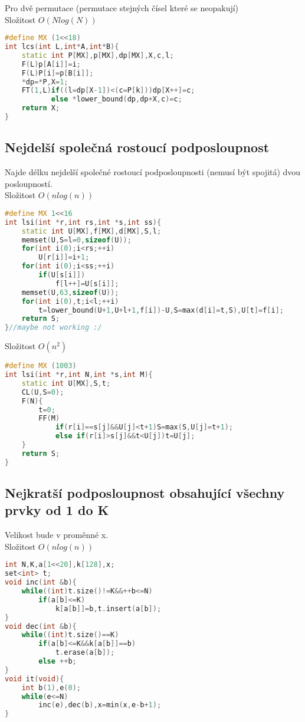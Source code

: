 \documentclass[11pt]{article}
\begin{document}
Pro dvě permutace (permutace stejných čísel které se neopakují)
\\Složitost $O(Nlog(N))$
\begin{lstlisting}[language=C++]
#define MX (1<<18)
int lcs(int L,int*A,int*B){
    static int P[MX],p[MX],dp[MX],X,c,l;
    F(L)p[A[i]]=i;
    F(L)P[i]=p[B[i]];
    *dp=*P,X=1;
    FT(1,L)if((l=dp[X-1])<(c=P[k]))dp[X++]=c;
           else *lower_bound(dp,dp+X,c)=c;
    return X;
}
\end{lstlisting}
\subsection{Nejdelší společná rostoucí podposloupnost}
Najde délku nejdelší společné rostoucí podposloupnosti (nemusí být spojitá) dvou posloupností.
\\Složitost $O(nlog(n))$
\begin{lstlisting}[language=C++]
#define MX 1<<16
int lsi(int *r,int rs,int *s,int ss){
    static int U[MX],f[MX],d[MX],S,l;
    memset(U,S=l=0,sizeof(U));
    for(int i(0);i<rs;++i)
        U[r[i]]=i+1;
    for(int i(0);i<ss;++i)
        if(U[s[i]])
            f[l++]=U[s[i]];
    memset(U,63,sizeof(U));
    for(int i(0),t;i<l;++i)
        t=lower_bound(U+1,U+l+1,f[i])-U,S=max(d[i]=t,S),U[t]=f[i];
    return S;
}//maybe not working :/
\end{lstlisting}
Složitost $O(n^2)$
\begin{lstlisting}[language=C++]
#define MX (1003)
int lsi(int *r,int N,int *s,int M){
    static int U[MX],S,t;
    CL(U,S=0);
    F(N){
        t=0;
        FF(M)
            if(r[i]==s[j]&&U[j]<t+1)S=max(S,U[j]=t+1);
            else if(r[i]>s[j]&&t<U[j])t=U[j];
    }
    return S;
}
\end{lstlisting}
\subsection{Nejkratší podposloupnost obsahující všechny prvky od 1 do K}
Velikost bude v proměnné \textsf{x}.
\\Složitost $O(nlog(n))$
\begin{lstlisting}[language=C++]
int N,K,a[1<<20],k[128],x;
set<int> t;
void inc(int &b){
    while((int)t.size()!=K&&++b<=N)
        if(a[b]<=K)
            k[a[b]]=b,t.insert(a[b]);
}
void dec(int &b){
    while((int)t.size()==K)
        if(a[b]<=K&&k[a[b]]==b)
            t.erase(a[b]);
        else ++b;
}
void it(void){
    int b(1),e(0);
    while(e<=N)
        inc(e),dec(b),x=min(x,e-b+1);
}
\end{lstlisting}
\end{document}
